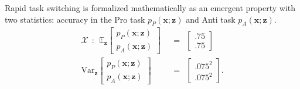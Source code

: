 \documentclass[11pt]{article}
\begin{document}

Rapid task switching is formalized mathematically as an emergent property with two statistics: accuracy in the Pro task $p_P(\mathbf{x}; \mathbf{z})$ and Anti task $p_A(\mathbf{x}; \mathbf{z})$.
\begin{equation}\label{eq:SC_EP}
\begin{split}
\mathcal{X} ~~:~~ \mathbb{E}_{\mathbf{z}}\begin{bmatrix} p_P(\mathbf{x}; \mathbf{z}) \\ p_A(\mathbf{x}; \mathbf{z}) \end{bmatrix}  &~~=~~  \begin{bmatrix} .75 \\ .75 \end{bmatrix}  \\ 
 \text{Var}_{\mathbf{z}}\begin{bmatrix} p_P(\mathbf{x}; \mathbf{z}) \\ p_A(\mathbf{x}; \mathbf{z}) \end{bmatrix}  &~~=~~  \begin{bmatrix} .075^2 \\ .075^2  \end{bmatrix}.
\end{split}
\end{equation}
\end{document}
